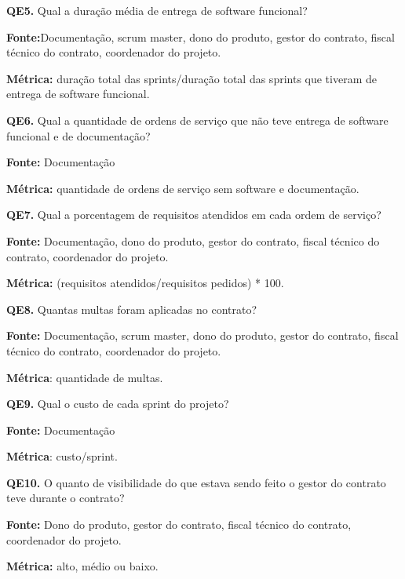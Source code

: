 \textbf{QE5.} Qual a duração média de entrega de software funcional?

\textbf{Fonte:}Documentação, scrum master, dono do produto, gestor do contrato, fiscal técnico do contrato, coordenador do projeto.

\textbf{Métrica:} duração total das sprints/duração total das sprints que tiveram de entrega de software funcional.

 \vspace{\onelineskip} 

\textbf{QE6.} Qual a quantidade de ordens de serviço que não teve entrega de software funcional e de documentação?

\textbf{Fonte:} Documentação

\textbf{Métrica:} quantidade de ordens de serviço sem software e documentação.

 \vspace{\onelineskip} 
 
\textbf{QE7.} Qual a porcentagem de requisitos atendidos em cada ordem de serviço?

\textbf{Fonte:} Documentação, dono do produto, gestor do contrato, fiscal técnico do contrato, coordenador do projeto.

\textbf{Métrica:} (requisitos atendidos/requisitos pedidos) * 100.
 
 \vspace{\onelineskip} 

\textbf{QE8.} Quantas multas foram aplicadas no contrato?

\textbf{Fonte:} Documentação, scrum master, dono do produto, gestor do contrato, fiscal técnico do contrato, coordenador do projeto.

\textbf{Métrica}: quantidade de multas.

 \vspace{\onelineskip}  

\textbf{QE9.} Qual o custo de cada sprint do projeto?

\textbf{Fonte:} Documentação

\textbf{Métrica}: custo/sprint.

 \vspace{\onelineskip}  

\textbf{QE10.} O quanto de visibilidade do que estava sendo feito o gestor do contrato teve durante o contrato?

\textbf{Fonte:} Dono do produto, gestor do contrato, fiscal técnico do contrato, coordenador do projeto.

\textbf{Métrica:} alto, médio ou baixo. 
 
